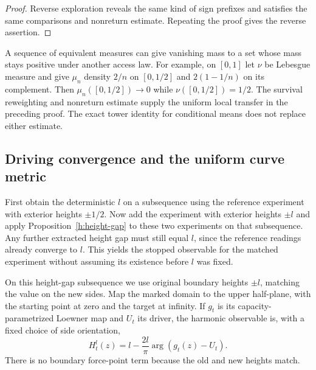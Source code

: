 \begin{proof}
Reverse exploration reveals the same kind of sign prefixes and
satisfies the same comparisons and nonreturn estimate. Repeating
the proof gives the reverse assertion.
\end{proof}

\begin{remark}
A sequence of equivalent measures can give vanishing mass to a set
whose mass stays positive under another access law. For example,
on $[0,1]$ let $\nu$ be Lebesgue measure and give $\mu_n$ density $2/n$
on $[0,1/2]$ and $2(1-1/n)$ on its complement. Then
$\mu_n([0,1/2])\to0$ while $\nu([0,1/2])=1/2$.
The survival reweighting and nonreturn estimate supply the uniform
local transfer in the preceding proof. The exact tower identity
for conditional means does not replace either estimate.
\end{remark}

\subsection{Driving convergence and the uniform curve metric}

First obtain the deterministic $l$ on a subsequence using the reference
experiment with exterior heights $\pm1/2$. Now add the experiment with
exterior heights $\pm l$ and apply Proposition~\ref{h:height-gap} to
these two experiments on that subsequence. Any further extracted
height gap must still equal $l$, since the reference readings
already converge to $l$. This yields the stopped observable for
the matched experiment without assuming its existence before
$l$ was fixed.

On this height-gap subsequence we use original boundary heights
$\pm l$, matching the value on the
new sides. Map the marked domain to the upper half-plane, with the
starting point at zero and the target at infinity. If $g_t$ is its
capacity-parametrized Loewner map and $U_t$ its driver, the harmonic
observable is, with a fixed choice of side orientation,
\begin{equation}\label{h:angle}
 H^l_t(z)=l-\frac{2l}{\pi}\arg(g_t(z)-U_t).
\end{equation}
There is no boundary force-point term because the old and new heights
match.

